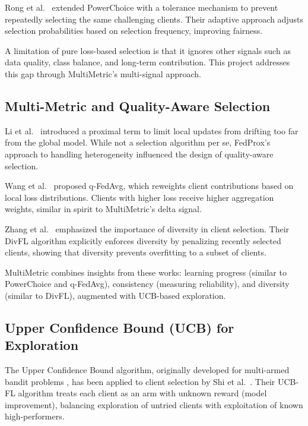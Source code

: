Rong et al.~\citep{rong2021powerfl} extended PowerChoice with a tolerance mechanism to prevent repeatedly selecting the same challenging clients. Their adaptive approach adjusts selection probabilities based on selection frequency, improving fairness.

A limitation of pure loss-based selection is that it ignores other signals such as data quality, class balance, and long-term contribution. This project addresses this gap through MultiMetric's multi-signal approach.

\subsection{Multi-Metric and Quality-Aware Selection}

Li et al.~\citep{li2020fedprox} introduced a proximal term to limit local updates from drifting too far from the global model. While not a selection algorithm per se, FedProx's approach to handling heterogeneity influenced the design of quality-aware selection.

Wang et al.~\citep{wang2021qfed} proposed q-FedAvg, which reweights client contributions based on local loss distributions. Clients with higher loss receive higher aggregation weights, similar in spirit to MultiMetric's delta signal.

Zhang et al.~\citep{zhang2021diversity} emphasized the importance of diversity in client selection. Their DivFL algorithm explicitly enforces diversity by penalizing recently selected clients, showing that diversity prevents overfitting to a subset of clients.

MultiMetric combines insights from these works: learning progress (similar to PowerChoice and q-FedAvg), consistency (measuring reliability), and diversity (similar to DivFL), augmented with UCB-based exploration.

\subsection{Upper Confidence Bound (UCB) for Exploration}

The Upper Confidence Bound algorithm, originally developed for multi-armed bandit problems \citep{auer2002finite}, has been applied to client selection by Shi et al.~\citep{shi2021ucbfl}. Their UCB-FL algorithm treats each client as an arm with unknown reward (model improvement), balancing exploration of untried clients with exploitation of known high-performers.


